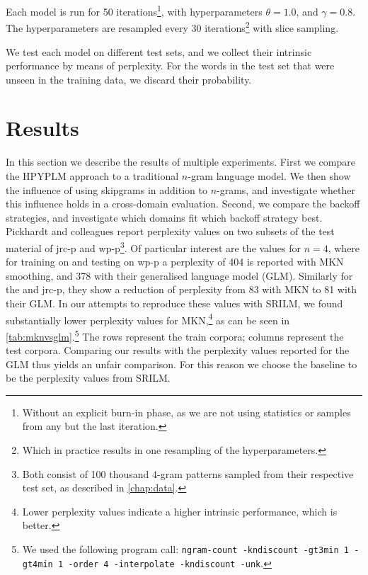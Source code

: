 Each model is run for 50 iterations\footnote{Without an explicit burn-in phase, as we are not using statistics or samples from any but the last iteration.}, with hyperparameters $\theta = 1.0$, and $\gamma = 0.8$. The hyperparameters are resampled every 30 iterations\footnote{Which in practice results in one resampling of the hyperparameters.} with slice sampling\autocite{walker2007sampling}.

We test each model on different test sets, and we collect their intrinsic performance by means of perplexity. For the words in the test set that were unseen in the training data, we discard their probability.

\section{Results}
In this section we describe the results of multiple experiments. First we compare the HPYPLM approach to a traditional $n$-gram language model. We then show the influence of using skipgrams in addition to $n$-grams, and investigate whether this influence holds in a cross-domain evaluation. Second, we compare the backoff strategies, and investigate which domains fit which backoff strategy best.
\clearpage
Pickhardt and colleagues\autocite{pickhardt2014generalized} report perplexity values on two subsets of the test material of jrc-p and wp-p\footnote{Both consist of 100 thousand $4$-gram patterns sampled from their respective test set, as described in \cref{chap:data}.}. Of particular interest are the values for $n =4$, where for training on \wp and testing on wp-p a perplexity of 404 is reported with MKN smoothing, and 378 with their generalised language model (GLM). Similarly for the \jrc and jrc-p, they show a reduction of perplexity from 83 with MKN to 81 with their GLM. In our attempts to reproduce these values with SRILM\autocite{stolcke2002srilm}, we found substantially lower perplexity values for MKN,\footnote{Lower perplexity values indicate a higher intrinsic performance, which is better.} as can be seen in \cref{tab:mknvsglm}.\footnote{We used the following program call: \texttt{ngram-count -kndiscount -gt3min 1 -gt4min 1 -order 4 -interpolate -kndiscount -unk}.}
 The rows represent the train corpora; columns represent the test corpora. Comparing our results with the perplexity values reported for the GLM thus yields an unfair comparison. For this reason we choose the baseline to be the perplexity values from SRILM.

